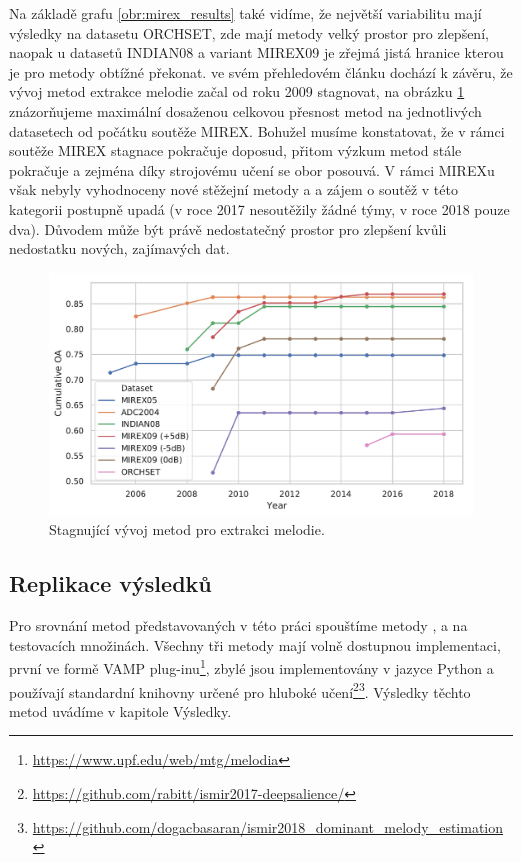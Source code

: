 Na základě grafu \ref{obr:mirex_results} také vidíme, že největší variabilitu mají výsledky na datasetu ORCHSET, zde mají metody velký prostor pro zlepšení, naopak u datasetů INDIAN08 a variant MIREX09 je zřejmá jistá hranice kterou je pro metody obtížné překonat. \cite{Salamon2014} ve svém přehledovém článku dochází k závěru, že vývoj metod extrakce melodie začal od roku 2009 stagnovat, na obrázku \ref{obr:mirex_results_cumulative} znázorňujeme maximální dosaženou celkovou přesnost metod na jednotlivých datasetech od počátku soutěže MIREX. Bohužel musíme konstatovat, že v rámci soutěže MIREX stagnace pokračuje doposud, přitom výzkum metod stále pokračuje a zejména díky strojovému učení se obor posouvá. V rámci MIREXu však nebyly vyhodnoceny nové stěžejní metody \cite{Bittner2017} a \cite{DBasaranSEssid2018} a zájem o soutěž v této kategorii postupně upadá (v roce 2017 nesoutěžily žádné týmy, v roce 2018 pouze dva). Důvodem může být právě nedostatečný prostor pro zlepšení kvůli nedostatku nových, zajímavých dat.

\begin{figure}[h]\centering
\includegraphics[scale=0.5]{../img/mirex_results_cumulative}
\caption{Stagnující vývoj metod pro extrakci melodie.}
\label{obr:mirex_results_cumulative}
\end{figure}

\subsection{Replikace výsledků}

Pro srovnání metod představovaných v této práci spouštíme metody \cite{Salamon2012a}, \cite{Bittner2017} a \cite{DBasaranSEssid2018} na testovacích množinách. Všechny tři metody mají volně dostupnou implementaci, první ve formě VAMP plug-inu\footnote{\url{https://www.upf.edu/web/mtg/melodia}}, zbylé jsou implementovány v jazyce Python a používají standardní knihovny určené pro hluboké učení\footnote{\url{https://github.com/rabitt/ismir2017-deepsalience/}}\footnote{\url{https://github.com/dogacbasaran/ismir2018_dominant_melody_estimation}}. Výsledky těchto metod uvádíme v kapitole Výsledky.

